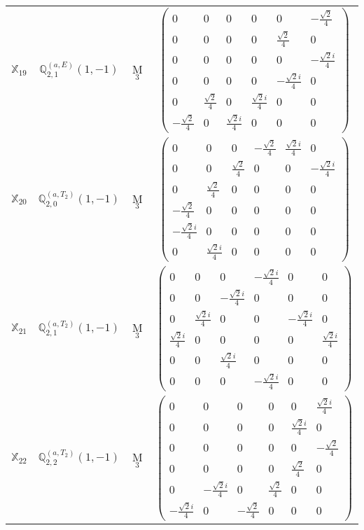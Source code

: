 \documentclass[fleqn,10pt,landscape]{article}
\begin{document}
\begin{itemize}
\begin{center}
\begin{longtable}{c|c|c|c}
$ \mathbb{X}_{19} $ & $\mathbb{Q}_{2,1}^{(a,E)}(1,-1)$ & M$_{3}$ & $\begin{pmatrix} 0 & 0 & 0 & 0 & 0 & - \frac{\sqrt{2}}{4} \\ 0 & 0 & 0 & 0 & \frac{\sqrt{2}}{4} & 0 \\ 0 & 0 & 0 & 0 & 0 & - \frac{\sqrt{2} i}{4} \\ 0 & 0 & 0 & 0 & - \frac{\sqrt{2} i}{4} & 0 \\ 0 & \frac{\sqrt{2}}{4} & 0 & \frac{\sqrt{2} i}{4} & 0 & 0 \\ - \frac{\sqrt{2}}{4} & 0 & \frac{\sqrt{2} i}{4} & 0 & 0 & 0 \end{pmatrix}$ \\
$ \mathbb{X}_{20} $ & $\mathbb{Q}_{2,0}^{(a,T_{2})}(1,-1)$ & M$_{3}$ & $\begin{pmatrix} 0 & 0 & 0 & - \frac{\sqrt{2}}{4} & \frac{\sqrt{2} i}{4} & 0 \\ 0 & 0 & \frac{\sqrt{2}}{4} & 0 & 0 & - \frac{\sqrt{2} i}{4} \\ 0 & \frac{\sqrt{2}}{4} & 0 & 0 & 0 & 0 \\ - \frac{\sqrt{2}}{4} & 0 & 0 & 0 & 0 & 0 \\ - \frac{\sqrt{2} i}{4} & 0 & 0 & 0 & 0 & 0 \\ 0 & \frac{\sqrt{2} i}{4} & 0 & 0 & 0 & 0 \end{pmatrix}$ \\
$ \mathbb{X}_{21} $ & $\mathbb{Q}_{2,1}^{(a,T_{2})}(1,-1)$ & M$_{3}$ & $\begin{pmatrix} 0 & 0 & 0 & - \frac{\sqrt{2} i}{4} & 0 & 0 \\ 0 & 0 & - \frac{\sqrt{2} i}{4} & 0 & 0 & 0 \\ 0 & \frac{\sqrt{2} i}{4} & 0 & 0 & - \frac{\sqrt{2} i}{4} & 0 \\ \frac{\sqrt{2} i}{4} & 0 & 0 & 0 & 0 & \frac{\sqrt{2} i}{4} \\ 0 & 0 & \frac{\sqrt{2} i}{4} & 0 & 0 & 0 \\ 0 & 0 & 0 & - \frac{\sqrt{2} i}{4} & 0 & 0 \end{pmatrix}$ \\
$ \mathbb{X}_{22} $ & $\mathbb{Q}_{2,2}^{(a,T_{2})}(1,-1)$ & M$_{3}$ & $\begin{pmatrix} 0 & 0 & 0 & 0 & 0 & \frac{\sqrt{2} i}{4} \\ 0 & 0 & 0 & 0 & \frac{\sqrt{2} i}{4} & 0 \\ 0 & 0 & 0 & 0 & 0 & - \frac{\sqrt{2}}{4} \\ 0 & 0 & 0 & 0 & \frac{\sqrt{2}}{4} & 0 \\ 0 & - \frac{\sqrt{2} i}{4} & 0 & \frac{\sqrt{2}}{4} & 0 & 0 \\ - \frac{\sqrt{2} i}{4} & 0 & - \frac{\sqrt{2}}{4} & 0 & 0 & 0 \end{pmatrix}$ \\

\end{longtable}
\end{center}
\end{itemize}
\end{document}
